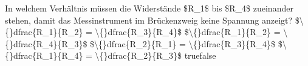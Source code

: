     {In welchem Verhältnis müssen die Widerstände \$R\_1\$ bis \$R\_4\$ zueinander stehen, damit das Messinstrument im Brückenzweig keine Spannung anzeigt?}
    {\$\textbackslash\{\}dfrac\{R\_1\}\{R\_2\} = \textbackslash\{\}dfrac\{R\_3\}\{R\_4\}\$}
    {\$\textbackslash\{\}dfrac\{R\_1\}\{R\_2\} = \textbackslash\{\}dfrac\{R\_4\}\{R\_3\}\$}
    {\$\textbackslash\{\}dfrac\{R\_2\}\{R\_1\} = \textbackslash\{\}dfrac\{R\_3\}\{R\_4\}\$}
    {\$\textbackslash\{\}dfrac\{R\_1\}\{R\_4\} = \textbackslash\{\}dfrac\{R\_2\}\{R\_3\}\$}
    {true}{false}